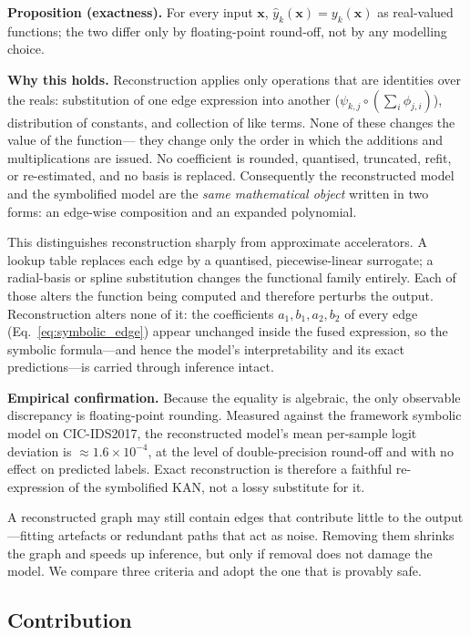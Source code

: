 \documentclass[conference]{IEEEtran}
\begin{document}
\textbf{Proposition (exactness).} For every input $\mathbf{x}$,
$\hat{y}_k(\mathbf{x}) = y_k(\mathbf{x})$ as real-valued functions; the two
differ only by floating-point round-off, not by any modelling choice.

\textbf{Why this holds.} Reconstruction applies only operations that are
identities over the reals: substitution of one edge expression into another
($\psi_{k,j}\circ(\sum_i\phi_{j,i})$), distribution of constants, and
collection of like terms. None of these changes the value of the function---
they change only the order in which the additions and multiplications are
issued. No coefficient is rounded, quantised, truncated, refit, or
re-estimated, and no basis is replaced. Consequently the reconstructed model
and the symbolified model are the \emph{same mathematical object} written in
two forms: an edge-wise composition and an expanded polynomial.

This distinguishes reconstruction sharply from approximate accelerators. A
lookup table replaces each edge by a quantised, piecewise-linear surrogate; a
radial-basis or spline substitution changes the functional family entirely.
Each of those alters the function being computed and therefore perturbs the
output. Reconstruction alters none of it: the coefficients
$a_{1},b_{1},a_{2},b_{2}$ of every edge
(Eq.~\eqref{eq:symbolic_edge}) appear unchanged inside the fused expression,
so the symbolic formula---and hence the model's interpretability and its exact
predictions---is carried through inference intact.

\textbf{Empirical confirmation.} Because the equality is algebraic, the only
observable discrepancy is floating-point rounding. Measured against the
framework symbolic model on CIC-IDS2017, the reconstructed model's mean
per-sample logit deviation is $\approx 1.6\times10^{-4}$, at the level of
double-precision round-off and with no effect on predicted labels. Exact
reconstruction is therefore a faithful re-expression of the symbolified KAN,
not a lossy substitute for it.

A reconstructed graph may still contain edges that contribute little to the
output---fitting artefacts or redundant paths that act as noise. Removing them
shrinks the graph and speeds up inference, but only if removal does not damage
the model. We compare three criteria and adopt the one that is provably safe.

\subsection{Contribution}
\end{document}
